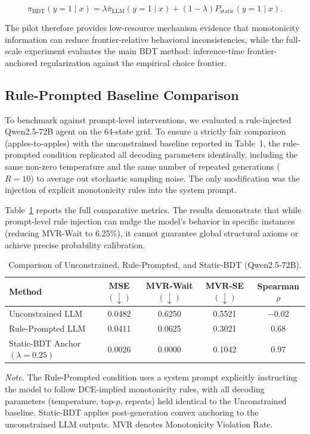 \documentclass[11pt]{article}
\begin{document}
\[
\pi_{\text{BDT}}(y=1 \mid x)
=
\lambda \bar{\pi}_{\text{LLM}}(y=1 \mid x)
+
(1-\lambda)P_{\text{static}}(y=1 \mid x).
\]

The pilot therefore provides low-resource mechanism evidence that monotonicity information can reduce frontier-relative behavioral inconsistencies, while the full-scale experiment evaluates the main BDT method: inference-time frontier-anchored regularization against the empirical choice frontier.


\subsection{Rule-Prompted Baseline Comparison}
\label{app:rule_prompted_baseline}

To benchmark against prompt-level interventions, we evaluated a rule-injected Qwen2.5-72B agent on the 64-state grid. To ensure a strictly fair comparison (apples-to-apples) with the unconstrained baseline reported in Table~1, the rule-prompted condition replicated all decoding parameters identically, including the same non-zero temperature and the same number of repeated generations ($R=10$) to average out stochastic sampling noise. The only modification was the injection of explicit monotonicity rules into the system prompt.

Table~\ref{tab:rule_prompted_comparison} reports the full comparative metrics. The results demonstrate that while prompt-level rule injection can nudge the model's behavior in specific instances (reducing MVR-Wait to 6.25\%), it cannot guarantee global structural axioms or achieve precise probability calibration.

\begin{table}[h]
\centering
\caption{Comparison of Unconstrained, Rule-Prompted, and Static-BDT (Qwen2.5-72B).}
\label{tab:rule_prompted_comparison}
\small
\begin{tabular}{l c c c c}
\toprule
\textbf{Method} & \textbf{MSE $(\downarrow)$} & \textbf{MVR-Wait $(\downarrow)$} & \textbf{MVR-SE $(\downarrow)$} & \textbf{Spearman $\rho$} \\
\midrule
Unconstrained LLM & 0.0482 & 0.6250 & 0.5521 & $-0.02$ \\
Rule-Prompted LLM & 0.0411 & 0.0625 & 0.3021 & 0.68 \\
Static-BDT Anchor $(\lambda=0.25)$ & 0.0026 & 0.0000 & 0.1042 & 0.97 \\
\bottomrule
\end{tabular}
\vspace{0.4em}
\begin{minipage}{0.95\textwidth}
\small
\textit{Note.} The Rule-Prompted condition uses a system prompt explicitly instructing the model to follow DCE-implied monotonicity rules, with all decoding parameters (temperature, top-$p$, repeats) held identical to the Unconstrained baseline. Static-BDT applies post-generation convex anchoring to the unconstrained LLM outputs. MVR denotes Monotonicity Violation Rate.
\end{minipage}
\end{table}
\end{document}
